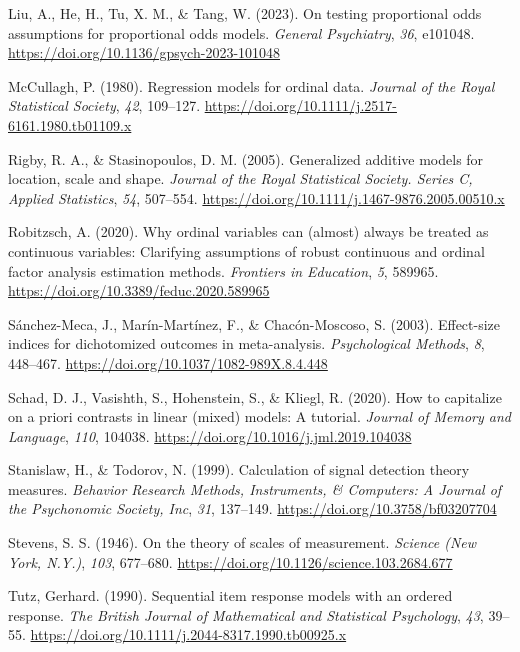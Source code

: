 \documentclass[
  man,floatsintext]{apa6}
\newlength{\cslhangindent}
\newenvironment{CSLReferences}[2] %
 {\begin{list}{}{%
  \setlength{\itemindent}{0pt}
  \setlength{\leftmargin}{0pt}
  \setlength{\parsep}{0pt}
  \ifodd #1
   \setlength{\leftmargin}{\cslhangindent}
   \setlength{\itemindent}{-1\cslhangindent}
  \fi
  \setlength{\itemsep}{#2\baselineskip}}}
 {\end{list}}
\begin{document}
\begin{CSLReferences}{1}{0}
Liu, A., He, H., Tu, X. M., \& Tang, W. (2023). On testing proportional odds assumptions for proportional odds models. \emph{General Psychiatry}, \emph{36}, e101048. \url{https://doi.org/10.1136/gpsych-2023-101048}

McCullagh, P. (1980). Regression models for ordinal data. \emph{Journal of the Royal Statistical Society}, \emph{42}, 109--127. \url{https://doi.org/10.1111/j.2517-6161.1980.tb01109.x}

Rigby, R. A., \& Stasinopoulos, D. M. (2005). Generalized additive models for location, scale and shape. \emph{Journal of the Royal Statistical Society. Series C, Applied Statistics}, \emph{54}, 507--554. \url{https://doi.org/10.1111/j.1467-9876.2005.00510.x}

Robitzsch, A. (2020). Why ordinal variables can (almost) always be treated as continuous variables: Clarifying assumptions of robust continuous and ordinal factor analysis estimation methods. \emph{Frontiers in Education}, \emph{5}, 589965. \url{https://doi.org/10.3389/feduc.2020.589965}

Sánchez-Meca, J., Marín-Martínez, F., \& Chacón-Moscoso, S. (2003). Effect-size indices for dichotomized outcomes in meta-analysis. \emph{Psychological Methods}, \emph{8}, 448--467. \url{https://doi.org/10.1037/1082-989X.8.4.448}

Schad, D. J., Vasishth, S., Hohenstein, S., \& Kliegl, R. (2020). How to capitalize on a priori contrasts in linear (mixed) models: A tutorial. \emph{Journal of Memory and Language}, \emph{110}, 104038. \url{https://doi.org/10.1016/j.jml.2019.104038}

Stanislaw, H., \& Todorov, N. (1999). Calculation of signal detection theory measures. \emph{Behavior Research Methods, Instruments, \& Computers: A Journal of the Psychonomic Society, Inc}, \emph{31}, 137--149. \url{https://doi.org/10.3758/bf03207704}

Stevens, S. S. (1946). On the theory of scales of measurement. \emph{Science (New York, N.Y.)}, \emph{103}, 677--680. \url{https://doi.org/10.1126/science.103.2684.677}

Tutz, Gerhard. (1990). Sequential item response models with an ordered response. \emph{The British Journal of Mathematical and Statistical Psychology}, \emph{43}, 39--55. \url{https://doi.org/10.1111/j.2044-8317.1990.tb00925.x}


\end{CSLReferences}
\end{document}
